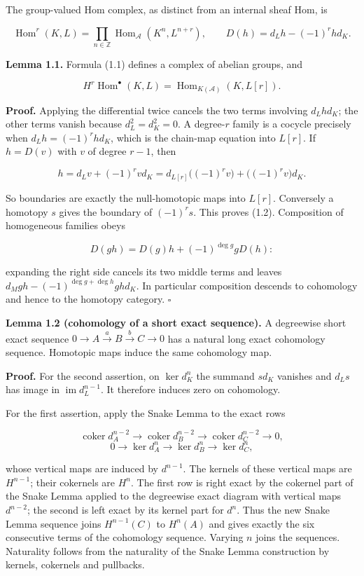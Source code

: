 \documentclass[
  english,
  11pt,
  a4paper,
]{article}
\begin{document}
The group-valued Hom complex, as distinct from an internal sheaf Hom, is

\[\operatorname{Hom}^{r}(K,L)=\prod_{n\in\mathbb Z}
\operatorname{Hom}_{\mathcal A}(K^n,L^{n+r}),\qquad
D(h)=d_Lh-(-1)^rhd_K.
\tag{1.1}\]

\textbf{Lemma 1.1.} Formula (1.1) defines a complex of abelian groups,
and

\[H^r\operatorname{Hom}^{\bullet}(K,L)
=\operatorname{Hom}_{K(\mathcal A)}(K,L[r]).
\tag{1.2}\]

\textbf{Proof.} Applying the differential twice cancels the two terms
involving \(d_Lhd_K\); the other terms vanish because \(d_L^2=d_K^2=0\).
A degree-\(r\) family is a cocycle precisely when \(d_Lh=(-1)^rhd_K\),
which is the chain-map equation into \(L[r]\). If \(h=D(v)\) with \(v\)
of degree \(r-1\), then

\[h=d_Lv+(-1)^rvd_K
=d_{L[r]}\bigl((-1)^rv\bigr)+\bigl((-1)^rv\bigr)d_K.\]

So boundaries are exactly the null-homotopic maps into \(L[r]\).
Conversely a homotopy \(s\) gives the boundary of \((-1)^rs\). This
proves (1.2). Composition of homogeneous families obeys

\[D(gh)=D(g)h+(-1)^{\deg g}gD(h):\]

expanding the right side cancels its two middle terms and leaves
\(d_Mgh-(-1)^{\deg g+\deg h}ghd_K\). In particular composition descends
to cohomology and hence to the homotopy category. \(\square\)

\textbf{Lemma 1.2 (cohomology of a short exact sequence).} A degreewise
short exact sequence \(0\to A\xrightarrow{a}B\xrightarrow{b}C\to0\) has
a natural long exact cohomology sequence. Homotopic maps induce the same
cohomology map.

\textbf{Proof.} For the second assertion, on \(\ker d_K^n\) the summand
\(sd_K\) vanishes and \(d_Ls\) has image in
\(\operatorname{im}d_L^{n-1}\). It therefore induces zero on cohomology.

For the first assertion, apply the Snake Lemma to the exact rows

\[\operatorname{coker}d_A^{n-2}\longrightarrow
\operatorname{coker}d_B^{n-2}\longrightarrow
\operatorname{coker}d_C^{n-2}\longrightarrow0,\]
\[0\longrightarrow\ker d_A^n\longrightarrow
\ker d_B^n\longrightarrow\ker d_C^n,\]

whose vertical maps are induced by \(d^{n-1}\). The kernels of these
vertical maps are \(H^{n-1}\); their cokernels are \(H^n\). The first
row is right exact by the cokernel part of the Snake Lemma applied to
the degreewise exact diagram with vertical maps \(d^{n-2}\); the second
is left exact by its kernel part for \(d^n\). Thus the new Snake Lemma
sequence joins \(H^{n-1}(C)\) to \(H^n(A)\) and gives exactly the six
consecutive terms of the cohomology sequence. Varying \(n\) joins the
sequences. Naturality follows from the naturality of the Snake Lemma
construction by kernels, cokernels and pullbacks.
\end{document}
